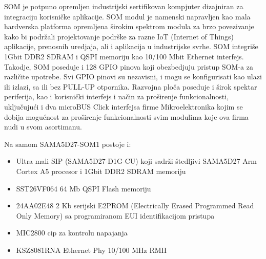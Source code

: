 \documentclass[a4paper,12pt, master]{etf}
\begin{document}

	SOM je potpuno opremljen industrijski sertifikovan kompjuter dizajniran za integraciju
	korisni\v{c}ke aplikacije. SOM modul je namenski napravljen kao mala hardverska platforma
	opremljena \v{s}irokim spektrom modula za brzo povezivanje kako bi podr\v{z}ali	
	projektovanje podr\v{s}ke za razne IoT (Internet of Things) aplikacije, prenosnih uredjaja, 
	ali i aplikacija u industrijske svrhe. SOM integri\v{s}e 1Gbit DDR2 SDRAM i QSPI memoriju 
	kao 10/100 Mbit Ethernet interfejs. Takodje, SOM poseduje i 128 GPIO pinova  
	koji obezbedjuju pristup SOM-a za razli\v{c}ite upotrebe. Svi GPIO pinovi su nezavisni, i 
	mogu se konfigurisati kao ulazi	ili izlazi, sa ili bez PULL-UP otpornika. Razvojna plo\v{c}a 
	poseduje  i \v{s}irok spektar periferija, kao i korisni\v{c}ki interfejs i na\v{c}in za 
	pro\v{s}irenje funkcionalnosti, uklju\v{c}uju\'{c}i i dva microBUS Click interfejsa firme 
	Mikroelektronika kojim se dobija mogu\'{c}nost za pro\v{s}irenje funkcionalnosti svim 
	modulima koje ova firma nudi u svom asortimanu.


	Na samom SAMA5D27-SOM1 postoje i:
	\begin{itemize}
		\item Ultra mali SIP (SAMA5D27-D1G-CU) koji sadr\v{z}i \v{s}tedljivi SAMA5D27 Arm Cortex 
		A5 procesor i 1Gbit DDR2 SDRAM memoriju
		\item SST26VF064 64 Mb QSPI Flash memoriju
		\item 24AA02E48 2 Kb serijski E2PROM (Electrically Erased Programmed Read Only Memory) 
		sa programiranom EUI identifikacijom pristupa
		\item MIC2800 cip za kontrolu napajanja
		\item KSZ8081RNA Ethernet Phy 10/100 MHz RMII
	\end{itemize}

\end{document}
